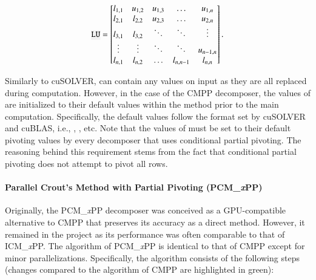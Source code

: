 \begin{equation}
	\code{LU} = {
		\begin{bmatrix}
			l _{1,1} & u _{1,2} & u _{1,3} & \ldots    & u _{1,n}   \\
			l_{2,1}	 & l _{2,2} & u _{2,3} & \ldots    & u _{2,n}   \\
			l_{3,1}  & l_{3,2} 	& \ddots   & \ddots    & \vdots 	 \\
			\vdots   & \vdots	& \ddots   & \ddots    & u _{n-1,n} \\
			l_{n,1}	 & l_{n,2}	& \ldots   & l_{n,n-1} & l _{n,n}
		\end{bmatrix}
	} \,.
	\label{Equation:implementation->decomposition-project->implemented-solutions->decomposers->CMPP}
\end{equation}

Similarly to cuSOLVER,  can contain any values on input as they are all replaced during computation. However, in the case of the CMPP decomposer, the values of  are initialized to their default values within the  method prior to the main computation. Specifically, the default values follow the format set by cuSOLVER and cuBLAS, i.e., , , etc. Note that the values of  must be set to their default pivoting values by every decomposer that uses conditional partial pivoting. The reasoning behind this requirement stems from the fact that conditional partial pivoting does not attempt to pivot all rows.

\paragraph{Parallel Crout's Method with Partial Pivoting (PCM\_\textit{x}PP)} Originally, the PCM\_\textit{x}PP decomposer was conceived as a GPU-compatible alternative to CMPP that preserves its accuracy as a direct method. However, it remained in the project as its performance was often comparable to that of ICM\_\textit{x}PP. The algorithm of PCM\_\textit{x}PP is identical to that of CMPP except for minor parallelizations. Specifically, the algorithm consists of the following steps (changes compared to the algorithm of CMPP are highlighted in green):

